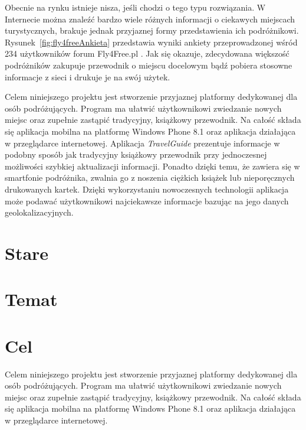 \documentclass{book}
\newcommand{\appName}{\emph{TravelGuide} }
\begin{document}
			Obecnie na rynku istnieje nisza, jeśli chodzi o tego typu rozwiązania. W Internecie można znaleźć bardzo wiele różnych informacji o ciekawych miejscach turystycznych, brakuje jednak przyjaznej formy przedstawienia ich podróżnikowi. 
			Rysunek~\ref{fig:fly4freeAnkieta} przedstawia wyniki ankiety przeprowadzonej wśród 234 użytkowników forum Fly4Free.pl \cite{id:fly4free}. Jak się okazuje, zdecydowana większość podróżników zakupuje przewodnik o miejscu docelowym bądź pobiera stosowne informacje z sieci i drukuje je na swój użytek.
			
			Celem niniejszego projektu jest stworzenie przyjaznej platformy dedykowanej dla osób podróżujących. Program ma ułatwić użytkownikowi zwiedzanie nowych miejsc oraz zupełnie zastąpić tradycyjny, książkowy przewodnik. Na całość składa się aplikacja mobilna na platformę Windows Phone 8.1 oraz aplikacja działająca w przeglądarce internetowej. 
			Aplikacja \appName prezentuje informacje w podobny sposób jak tradycyjny książkowy przewodnik przy jednoczesnej możliwości szybkiej aktualizacji informacji. Ponadto dzięki temu, że zawiera się w smartfonie podróżnika, zwalnia go z noszenia ciężkich książek lub nieporęcznych drukowanych kartek. 
			Dzięki wykorzystaniu nowoczesnych technologii aplikacja może podawać użytkownikowi najciekawsze informacje bazując na jego danych geolokalizacyjnych. 
		
	
	
	
	    \section{Stare}
	
		\section{Temat}
	
		\section{Cel}
		Celem niniejszego projektu jest stworzenie przyjaznej platformy dedykowanej dla osób podróżujących. Program ma ułatwić użytkownikowi zwiedzanie nowych miejsc oraz zupełnie zastąpić tradycyjny, książkowy przewodnik. Na całość składa się aplikacja mobilna na platformę Windows Phone 8.1 oraz aplikacja działająca w przeglądarce internetowej. 
\end{document}
